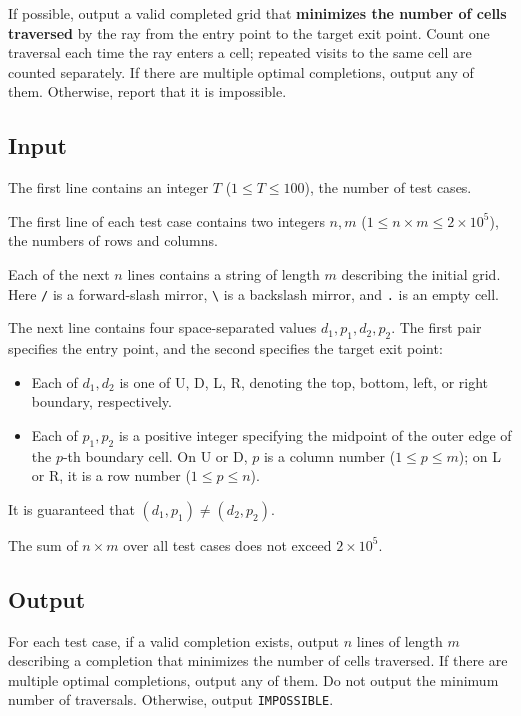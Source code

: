 If possible, output a valid completed grid that \textbf{minimizes the number of cells traversed} by the ray from the entry point to the target exit point. Count one traversal each time the ray enters a cell; repeated visits to the same cell are counted separately. If there are multiple optimal completions, output any of them. Otherwise, report that it is impossible.

\subsection{Input}

The first line contains an integer $T$ ($1 \le T \le 100$), the number of test cases.

The first line of each test case contains two integers $n,m$ ($1 \le n \times m \le 2 \times 10^5$), the numbers of rows and columns.

Each of the next $n$ lines contains a string of length $m$ describing the initial grid. Here \texttt{/} is a forward-slash mirror, \texttt{\textbackslash} is a backslash mirror, and \texttt{.} is an empty cell.

The next line contains four space-separated values $d_1,p_1,d_2,p_2$. The first pair specifies the entry point, and the second specifies the target exit point:

\begin{itemize}
	\item Each of $d_1,d_2$ is one of U, D, L, R, denoting the top, bottom, left, or right boundary, respectively.
	\item Each of $p_1,p_2$ is a positive integer specifying the midpoint of the outer edge of the $p$-th boundary cell. On U or D, $p$ is a column number ($1 \le p \le m$); on L or R, it is a row number ($1 \le p \le n$).
\end{itemize}

It is guaranteed that $(d_1,p_1) \ne (d_2,p_2)$.

The sum of $n \times m$ over all test cases does not exceed $2 \times 10^5$.

\subsection{Output}

For each test case, if a valid completion exists, output $n$ lines of length $m$ describing a completion that minimizes the number of cells traversed. If there are multiple optimal completions, output any of them. Do not output the minimum number of traversals. Otherwise, output \texttt{IMPOSSIBLE}.


